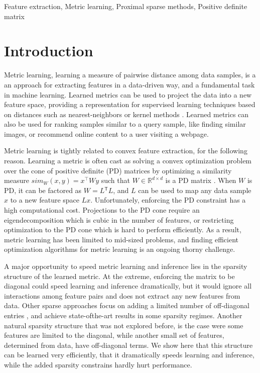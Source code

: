 \documentclass[twoside,11pt]{article}
\newcommand\mat[1]{{#1}}
\newcommand{\T}{{}^\mathsf{T}}
\newcommand{\W}{\mat{W}}
\newcommand{\R}{\mathbb{R}}
\newcommand{\cholL}{\mat{L}}
\begin{document}
\begin{keywords}
  Feature extraction, Metric learning, Proximal sparse methods, Positive definite matrix 
\end{keywords}

\section{Introduction}
\vskip -5pt
Metric learning, learning a measure of pairwise distance among data samples, is a an approach for extracting features in a data-driven way, and a fundamental task in machine learning. Learned metrics can be used to project the data into a new feature space, providing a representation for supervised learning techniques based on distances such as nearest-neighbors or kernel methods \citep{kulis2012survey}.
Learned metrics can also be used for ranking samples similar to a query sample, like finding similar images, or recommend online content to a user visiting a webpage. 

Metric learning is tightly related to convex feature extraction, for the following reason. Learning a metric is often cast as solving a convex optimization problem over the cone of positive definite (PD) matrices by optimizing a similarity measure $sim_W (x,y) = x^\top W y$ such that $W \in \R^{d \times d}$ is a PD matrix  \citep{kulis2012survey,bellet2013survey}. 
When $\W$ is PD, it can be factored as $\W= \cholL\T \cholL$, and $\cholL$ can be used to map any data sample $x$ to a new feature space $\cholL x$. Unfortunately, enforcing the PD constraint has a high computational cost. Projections to the PD cone require an eigendecomposition which is cubic in the number of features, or restricting optimization to the PD cone which is hard to perform efficiently. As a result, metric learning has been limited to mid-sized problems, and finding efficient optimization algorithms for metric learning is an ongoing thorny challenge. 

A major opportunity to speed metric learning and inference lies in the sparsity structure of the learned metric. At the extreme, enforcing the matrix to be diagonal could speed learning and inference dramatically, but it would ignore all interactions among feature pairs and does not extract any new features from  data. Other sparse approaches focus on adding a limited number of off-diagonal entries \citep{HDSL}, and achieve state-ofthe-art results in some sparsity regimes. Another natural sparsity structure that was not explored before, is the case were some features are limited to the diagonal, while another small set of features, determined from data, have off-diagonal terms. We show here that this structure can be learned very efficiently, that it dramatically speeds learning and inference, while the added sparsity constrains hardly hurt performance. 
\end{document}
